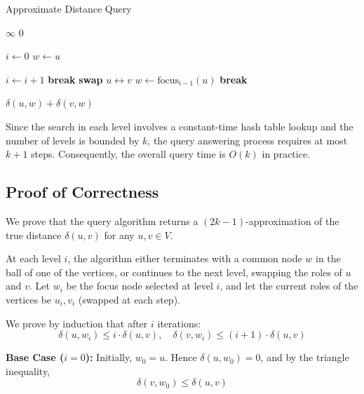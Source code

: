 \documentclass{article}
\begin{document}
\begin{algorithm}[H]
    \caption{Approximate Distance Query}
    \begin{algorithmic}[1]
            \State \Return $\infty$
        \EndIf
            \State \Return $0$
        \EndIf
    
        \State $i \gets 0$
        \State $w \gets u$
        
            \State $i \gets i + 1$
                \State \textbf{break}
            \EndIf
            \State \textbf{swap} $u \leftrightarrow v$
            \State $w \gets \text{focus}_{i-1}(u)$
                \State \textbf{break}
            \EndIf
        \EndWhile
    
        \Return $\delta(u, w) + \delta(v, w)$
    \EndFunction
    \end{algorithmic}
    \end{algorithm}

Since the search in each level involves a constant-time hash table lookup and the number of levels is bounded by \(k\), the query answering process requires at most \(k+1\) steps.  Consequently, the overall query time is \(O(k)\) in practice.

\subsection{Proof of Correctness}

We prove that the query algorithm returns a \((2k-1)\)-approximation of the true distance \(\delta(u, v)\) for any \(u, v \in V\).

At each level \(i\), the algorithm either terminates with a common node \(w\) in the ball of one of the vertices, or continues to the next level, swapping the roles of \(u\) and \(v\). Let \(w_i\) be the focus node selected at level \(i\), and let the current roles of the vertices be \(u_i, v_i\) (swapped at each step).

We prove by induction that after \(i\) iterations:
\[
\delta(u, w_i) \le i \cdot \delta(u, v), \quad
\delta(v, w_i) \le (i+1) \cdot \delta(u, v)
\]

\textbf{Base Case (\(i=0\)):}  
Initially, \(w_0 = u\). Hence \(\delta(u, w_0) = 0\), and by the triangle inequality,
\[
\delta(v, w_0) \le \delta(u, v)
\]
\end{document}
